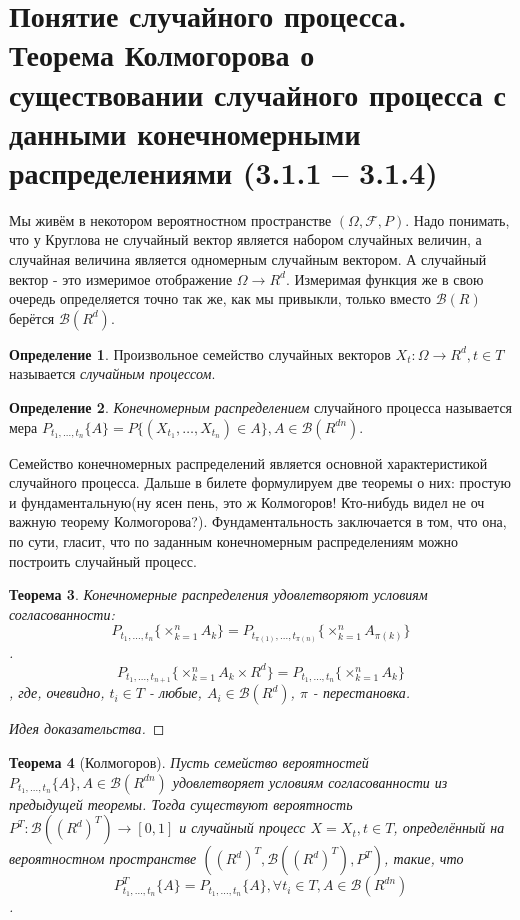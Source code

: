 \documentclass[16pt]{article}
\newtheorem{theorem}{Теорема}[section]
\theoremstyle{definition}
\newtheorem{definition}[theorem]{Определение}
\begin{document}
\section{Понятие случайного процесса. Теорема Колмогорова о существовании случайного
процесса с данными конечномерными распределениями (3.1.1 – 3.1.4)}
Мы живём в некотором вероятностном пространстве $(\Omega, \mathcal{F}, P)$. Надо понимать, что у Круглова не случайный вектор является набором случайных величин, а случайная величина является одномерным случайным вектором. А случайный вектор - это измеримое отображение $\Omega \rightarrow R^d$. Измеримая функция же в свою очередь определяется точно так же, как мы привыкли, только вместо $\mathcal{B}(R)$ берётся $\mathcal{B}(R^d)$.
\begin{definition}
Произвольное семейство случайных векторов $X_t: \Omega \rightarrow R^d, t \in T$ называется \textit{случайным процессом}.
\end{definition}
\begin{definition}
\textit{Конечномерным распределением} случайного процесса называется мера $P_{t_1, \ldots, t_n}\{A\} = P\{(X_{t_1}, \ldots, X_{t_n}) \in A\}, A \in \mathcal{B}(R^{dn})$.
\end{definition}
Семейство конечномерных распределений является основной характеристикой случайного процесса. Дальше в билете формулируем две теоремы о них: простую и фундаментальную(ну ясен пень, это ж Колмогоров! Кто-нибудь видел не оч важную теорему Колмогорова?). Фундаментальность заключается в том, что она, по сути, гласит, что по заданным конечномерным распределениям можно построить случайный процесс.
\begin{theorem}
Конечномерные распределения удовлетворяют условиям согласованности:
$$P_{t_1, \ldots, t_n}\{\times_{k=1}^n A_k\} = P_{t_{\pi(1)}, \ldots, t_{\pi(n)}}\{\times_{k=1}^n A_{\pi(k)}\}$$.
$$P_{t_1, \ldots, t_{n+1}}\{\times_{k=1}^n A_k \times R^d\} = P_{t_1, \ldots, t_n}\{\times_{k=1}^n A_k\}$$, где, очевидно, $t_i \in T$ - любые, $A_i \in \mathcal{B}(R^d)$, $\pi$ - перестановка.
\end{theorem}
\begin{proof}[Идея доказательства]

\end{proof}
\begin{theorem}[Колмогоров]
Пусть семейство вероятностей $P_{t_1, \ldots, t_n}\{A\}, A \in \mathcal{B}(R^{dn})$ удовлетворяет условиям согласованности из предыдущей теоремы. Тогда существуют вероятность $P^T: \mathcal{B}((R^d)^T) \rightarrow [0, 1]$ и случайный процесс $X = {X_t, t \in T}$, определённый на вероятностном пространстве $((R^d)^T, \mathcal{B}((R^d)^T), P^T)$, такие, что $$P_{t_1, \ldots, t_n}^T\{A\} = P_{t_1, \ldots, t_n}\{A\}, \forall t_i \in T, A \in \mathcal{B}(R^{dn})$$.
\end{theorem}
\end{document}
